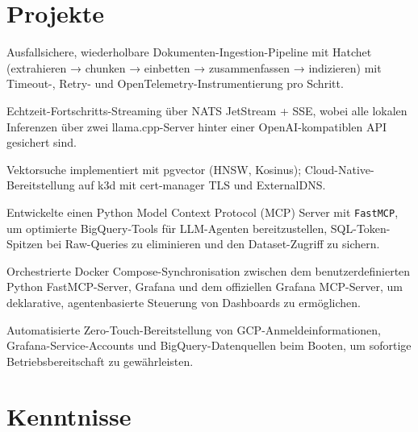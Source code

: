 \documentclass[10pt,a4paper]{resume}
\begin{document}
\vspace{2pt}

\section{Projekte}

\bullets
  \item Ausfallsichere, wiederholbare Dokumenten-Ingestion-Pipeline mit Hatchet (extrahieren → chunken → einbetten → zusammenfassen → indizieren) mit Timeout-, Retry- und OpenTelemetry-Instrumentierung pro Schritt.
  \item Echtzeit-Fortschritts-Streaming über NATS JetStream + SSE, wobei alle lokalen Inferenzen über zwei llama.cpp-Server hinter einer OpenAI-kompatiblen API gesichert sind.
  \item Vektorsuche implementiert mit pgvector (HNSW, Kosinus); Cloud-Native-Bereitstellung auf k3d mit cert-manager TLS und ExternalDNS.
\bulletsend
\vspace{1.0pt}
\bullets
  \item Entwickelte einen Python Model Context Protocol (MCP) Server mit \texttt{FastMCP}, um optimierte BigQuery-Tools für LLM-Agenten bereitzustellen, SQL-Token-Spitzen bei Raw-Queries zu eliminieren und den Dataset-Zugriff zu sichern.
  \item Orchestrierte Docker Compose-Synchronisation zwischen dem benutzerdefinierten Python FastMCP-Server, Grafana und dem offiziellen Grafana MCP-Server, um deklarative, agentenbasierte Steuerung von Dashboards zu ermöglichen.
  \item Automatisierte Zero-Touch-Bereitstellung von GCP-Anmeldeinformationen, Grafana-Service-Accounts und BigQuery-Datenquellen beim Booten, um sofortige Betriebsbereitschaft zu gewährleisten.
\bulletsend

\section{Kenntnisse}
\end{document}
